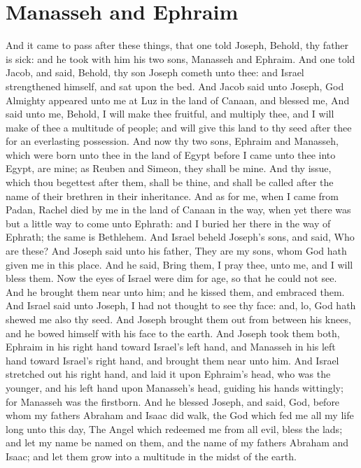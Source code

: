 \section*{Manasseh and Ephraim}
\begin{biblechapter} %
\verse And it came to pass after these things, that one told Joseph, Behold, thy father is sick: and he took with him his two sons, Manasseh and Ephraim.
\verse And one told Jacob, and said, Behold, thy son Joseph cometh unto thee: and Israel strengthened himself, and sat upon the bed.
\verse And Jacob said unto Joseph, God Almighty appeared unto me at Luz in the land of Canaan, and blessed me,
\verse And said unto me, Behold, I will make thee fruitful, and multiply thee, and I will make of thee a multitude of people; and will give this land to thy seed after thee for an everlasting possession.
\verse And now thy two sons, Ephraim and Manasseh, which were born unto thee in the land of Egypt before I came unto thee into Egypt, are mine; as Reuben and Simeon, they shall be mine.
\verse And thy issue, which thou begettest after them, shall be thine, and shall be called after the name of their brethren in their inheritance.
\verse And as for me, when I came from Padan, Rachel died by me in the land of Canaan in the way, when yet there was but a little way to come unto Ephrath: and I buried her there in the way of Ephrath; the same is Bethlehem.
\verse And Israel beheld Joseph's sons, and said, Who are these?
\verse And Joseph said unto his father, They are my sons, whom God hath given me in this place. And he said, Bring them, I pray thee, unto me, and I will bless them.
\verse Now the eyes of Israel were dim for age, so that he could not see. And he brought them near unto him; and he kissed them, and embraced them.
\verse And Israel said unto Joseph, I had not thought to see thy face: and, lo, God hath shewed me also thy seed.
\verse And Joseph brought them out from between his knees, and he bowed himself with his face to the earth.
\verse And Joseph took them both, Ephraim in his right hand toward Israel's left hand, and Manasseh in his left hand toward Israel's right hand, and brought them near unto him.
\verse And Israel stretched out his right hand, and laid it upon Ephraim's head, who was the younger, and his left hand upon Manasseh's head, guiding his hands wittingly; for Manasseh was the firstborn.
\verse And he blessed Joseph, and said, God, before whom my fathers Abraham and Isaac did walk, the God which fed me all my life long unto this day,
\verse The Angel which redeemed me from all evil, bless the lads; and let my name be named on them, and the name of my fathers Abraham and Isaac; and let them grow into a multitude in the midst of the earth.

\end{biblechapter}
